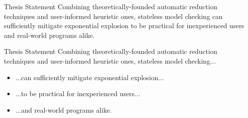\documentclass[xcolor=dvipsnames]{beamer}
\newcommand\hilight[2]{\color{#1}#2\color{black}}
\begin{document}

\begin{frame}{Thesis Statement}
	Combining %
	theoretically-founded automatic reduction techniques
	and user-informed heuristic ones,
	stateless model checking can sufficiently mitigate exponential explosion to be
	practical for inexperienced users
	and real-world programs alike.
\end{frame}

\begin{frame}{Thesis Statement}
	\hilight{gray}{Combining %
	theoretically-founded automatic reduction techniques
	and user-informed heuristic ones, stateless model checking...}
	\begin{itemize}
		\item \hilight{sect-quicksand}{...can sufficiently mitigate exponential explosion...}\xspace
		\item \hilight{sect-410}{...to be practical for inexperienced users...}\xspace
		\item \hilight{sect-htm}{...and real-world programs alike.}\xspace
	\end{itemize}
\end{frame}
\end{document}
